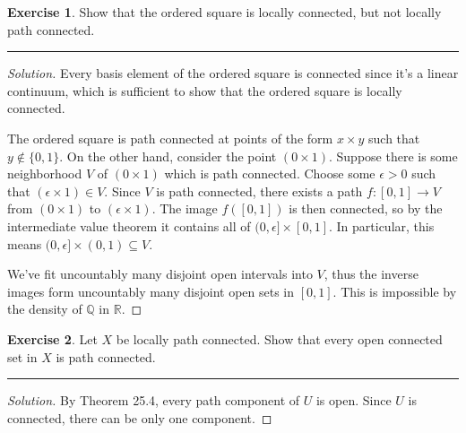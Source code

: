 \documentclass{article}
\theoremstyle{definition}
\newtheorem{exercise}{Exercise}[section]
\begin{document}
\begin{exercise}
  Show that the ordered square is locally connected, but not locally path connected.
\end{exercise}
\hrule
\begin{proof}[Solution]
  Every basis element of the ordered square is connected since it's a linear continuum, which is sufficient to show that the ordered square is locally connected.

  The ordered square is path connected at points of the form $x\times y$ such that $y\notin\{0,1\}$. On the other hand, consider the point $(0\times 1)$. Suppose there is some neighborhood $V$ of $(0\times 1)$ which is path connected. Choose some $\epsilon > 0$ such that $(\epsilon\times 1)\in V$. Since $V$ is path connected, there exists a path $f:[0,1]\to V$ from $(0\times 1)$ to $(\epsilon\times 1)$. The image $f([0,1])$ is then connected, so by the intermediate value theorem it contains all of $(0,\epsilon]\times [0,1]$. In particular, this means $(0,\epsilon]\times(0,1)\subseteq V$.

  We've fit uncountably many disjoint open intervals into $V$, thus the inverse images form uncountably many disjoint open sets in $[0,1]$. This is impossible by the density of $\mathbb{Q}$ in $\mathbb{R}$.
\end{proof}

\pagebreak

\begin{exercise}
  Let $X$ be locally path connected. Show that every open connected set in $X$ is path connected.
\end{exercise}
\hrule
\begin{proof}[Solution]
  By Theorem 25.4, every path component of $U$ is open. Since $U$ is connected, there can be only one component.
\end{proof}

\pagebreak
\end{document}
